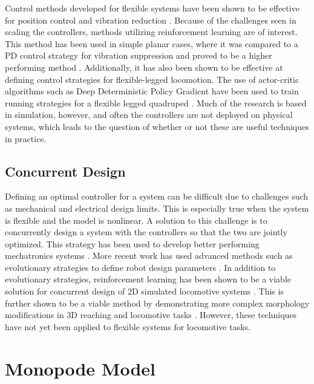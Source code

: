 \documentclass[10pt,twocolumn,letterpaper]{article}
\begin{document}
Control methods developed for flexible systems have been shown to be effective for position control and vibration reduction \cite{Luo1993, Ahmadi1997}. Because of the challenges seen in scaling the controllers, methods utilizing reinforcement learning are of interest. This method has been used in simple planar cases, where it was compared to a PD control strategy for vibration suppression and proved to be a higher performing method \cite{He2020f}. Additionally, it has also been shown to be effective at defining control strategies for flexible-legged locomotion. The use of actor-critic algorithms such as Deep Deterministic Policy Gradient \cite{Lillicrap2016h} have been used to train running strategies for a flexible legged quadruped \cite{Dwiel2019d}. Much of the research is based in simulation, however, and often the controllers are not deployed on physical systems, which leads to the question of whether or not these are useful techniques in practice.

\subsection{Concurrent Design}

Defining an optimal controller for a system can be difficult due to challenges such as mechanical and electrical design limits. This is especially true when the system is flexible and the model is nonlinear. A solution to this challenge is to concurrently design a system with the controllers so that the two are jointly optimized. This strategy has been used to develop better performing mechatronics systems \cite{Li2001}.  More recent work has used advanced methods such as evolutionary strategies to define robot design parameters \cite{Wang2019}. In addition to evolutionary strategies, reinforcement learning has been shown to be a viable solution for concurrent design of 2D simulated locomotive systems \cite{Ha2019j}. This is further shown to be a viable method by demonstrating more complex morphology modifications in 3D reaching and locomotive tasks \cite{Schaff2019e}. However, these techniques have not yet been applied to flexible systems for locomotive tasks. 


\section{Monopode Model}
\label{sec:monopode_model}
\end{document}
